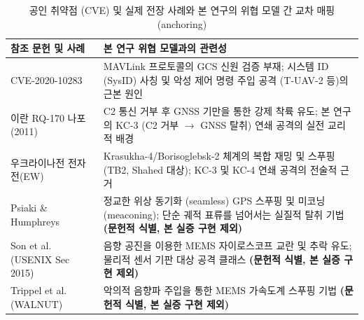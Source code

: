 \begin{table}[H]
\centering
\caption{공인 취약점 (CVE) 및 실제 전장 사례와 본 연구의 위협 모델 간 교차 매핑 (anchoring)}
\label{tab:cve_anchoring}
\renewcommand{\arraystretch}{1.3}
\small
\begin{tabularx}{\textwidth}{@{} l >{\raggedright\arraybackslash}X @{}}
\toprule
\textbf{참조 문헌 및 사례} & \textbf{본 연구 위협 모델과의 관련성} \\
\midrule
CVE-2020-10283~\cite{cve202010283} & MAVLink 프로토콜의 GCS 신원 검증 부재; 시스템 ID (SysID) 사칭 및 악성 제어 명령 주입 공격 (T-UAV-2 등)의 근본 원인 \\
이란 RQ-170 나포 (2011)~\cite{humphreys_testimony_2012} & C2 통신 거부 후 GNSS 기만을 통한 강제 착륙 유도; 본 연구의 KC-3 (C2 거부 $\to$ GNSS 탈취) 연쇄 공격의 실전 교리적 배경 \\
우크라이나전 전자전(EW)~\cite{rusi_russian_airwar_2022} & Krasukha-4/Borisoglebsk-2 체계의 복합 재밍 및 스푸핑 (TB2, Shahed 대상); KC-3 및 KC-4 연쇄 공격의 전술적 근거 \\
Psiaki \& Humphreys~\cite{psiaki_humphreys_2016} & 정교한 위상 동기화 (seamless) GPS 스푸핑 및 미코닝 (meaconing); 단순 궤적 표류를 넘어서는 실질적 탈취 기법 \textbf{(문헌적 식별, 본 실증 구현 제외)} \\
Son et al. (USENIX Sec 2015)~\cite{son2015rocking} & 음향 공진을 이용한 MEMS 자이로스코프 교란 및 추락 유도; 물리적 센서 기판 대상 공격 클래스 \textbf{(문헌적 식별, 본 실증 구현 제외)} \\
Trippel et al. (WALNUT)~\cite{trippel2017walnut} & 악의적 음향파 주입을 통한 MEMS 가속도계 스푸핑 기법 \textbf{(문헌적 식별, 본 실증 구현 제외)} \\
\bottomrule
\end{tabularx}
\end{table}

